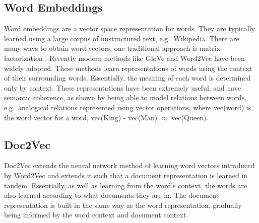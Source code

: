 \subsection{Word Embeddings}\label{bg:WordVectors}


Word embeddings are a vector space representation for  words. They are typically learned using a large corpus of unstructured text, e.g.\ Wikipedia.  There are many ways to obtain word-vectors, one traditional approach is  matrix factorization \cite{Evy2007}. Recently modern methods like GloVe \cite{Pennington2014} and Word2Vec \cite{Mikolov2013} have been widely adopted. These methods learn representations of  words using the context of their surrounding words.  Essentially, the meaning of each word is determined only by  context. These representations have been extremely useful, and have semantic coherence, as shown by  being able to model relations between words, e.g.\  analogical relations represented using  vector operations, where vec(word) is the word vector for a word,   vec(King) - vec(Man) $\approx$ vec(Queen).             

\subsection{Doc2Vec}\label{ch2:doc2vec}

Doc2Vec \cite{Le2014a} extends the neural network method of learning word vectors introduced by Word2Vec \cite{Mikolov2013} and extends it such  that a document representation is learned in tandem. Essentially, as well as learning from the word's context, the words are also learned according to  what documents they are in. The document representation is built in the same way as the word representation, gradually being informed by the word context and document context.



